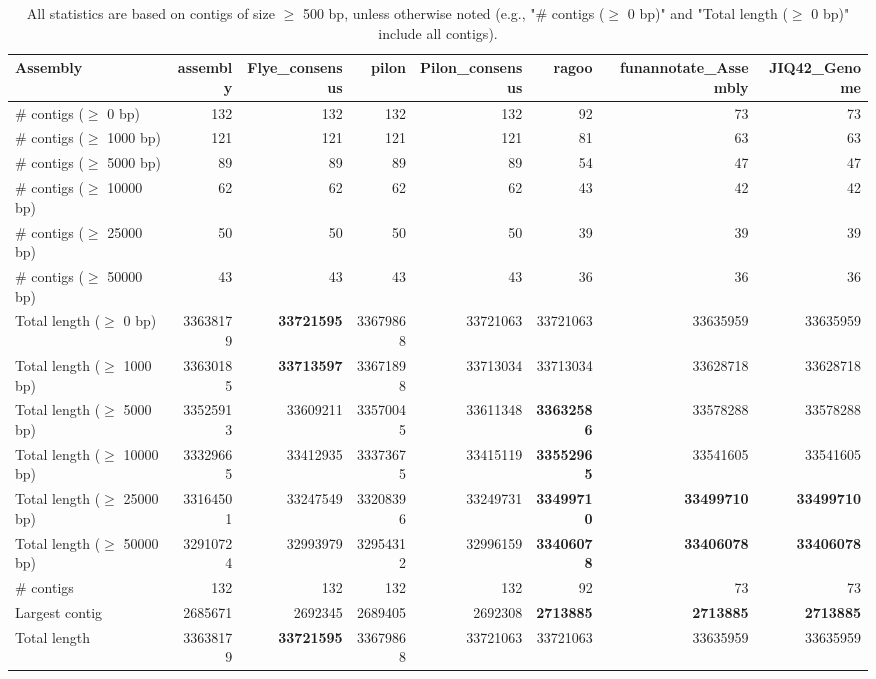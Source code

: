 \documentclass[12pt,a4paper]{article}
\begin{document}
\begin{table}[ht]
\begin{center}
\caption{All statistics are based on contigs of size $\geq$ 500 bp, unless otherwise noted (e.g., "\# contigs ($\geq$ 0 bp)" and "Total length ($\geq$ 0 bp)" include all contigs).}
\begin{tabular}{|l*{7}{|r}|}
\hline
Assembly & assembly & Flye\_consensus & pilon & Pilon\_consensus & ragoo & funannotate\_Assembly & JIQ42\_Genome \\ \hline
\# contigs ($\geq$ 0 bp) & 132 & 132 & 132 & 132 & 92 & 73 & 73 \\ \hline
\# contigs ($\geq$ 1000 bp) & 121 & 121 & 121 & 121 & 81 & 63 & 63 \\ \hline
\# contigs ($\geq$ 5000 bp) & 89 & 89 & 89 & 89 & 54 & 47 & 47 \\ \hline
\# contigs ($\geq$ 10000 bp) & 62 & 62 & 62 & 62 & 43 & 42 & 42 \\ \hline
\# contigs ($\geq$ 25000 bp) & 50 & 50 & 50 & 50 & 39 & 39 & 39 \\ \hline
\# contigs ($\geq$ 50000 bp) & 43 & 43 & 43 & 43 & 36 & 36 & 36 \\ \hline
Total length ($\geq$ 0 bp) & 33638179 & {\bf 33721595} & 33679868 & 33721063 & 33721063 & 33635959 & 33635959 \\ \hline
Total length ($\geq$ 1000 bp) & 33630185 & {\bf 33713597} & 33671898 & 33713034 & 33713034 & 33628718 & 33628718 \\ \hline
Total length ($\geq$ 5000 bp) & 33525913 & 33609211 & 33570045 & 33611348 & {\bf 33632586} & 33578288 & 33578288 \\ \hline
Total length ($\geq$ 10000 bp) & 33329665 & 33412935 & 33373675 & 33415119 & {\bf 33552965} & 33541605 & 33541605 \\ \hline
Total length ($\geq$ 25000 bp) & 33164501 & 33247549 & 33208396 & 33249731 & {\bf 33499710} & {\bf 33499710} & {\bf 33499710} \\ \hline
Total length ($\geq$ 50000 bp) & 32910724 & 32993979 & 32954312 & 32996159 & {\bf 33406078} & {\bf 33406078} & {\bf 33406078} \\ \hline
\# contigs & 132 & 132 & 132 & 132 & 92 & 73 & 73 \\ \hline
Largest contig & 2685671 & 2692345 & 2689405 & 2692308 & {\bf 2713885} & {\bf 2713885} & {\bf 2713885} \\ \hline
Total length & 33638179 & {\bf 33721595} & 33679868 & 33721063 & 33721063 & 33635959 & 33635959 \\ \hline

\end{tabular}
\end{center}
\end{table}
\end{document}
